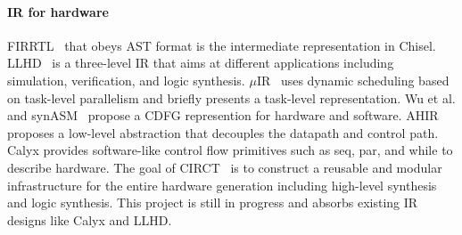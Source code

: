 


\paragraph{IR for hardware} FIRRTL~\cite{firrtl} that obeys AST format is the intermediate representation in Chisel. LLHD~\cite{LLHD_Schuiki} is a three-level IR that aims at different applications including simulation, verification, and logic synthesis. $\mu$IR~\cite{uIR_Sharifian} uses dynamic scheduling based on task-level parallelism and briefly presents a task-level representation. Wu et al. and synASM~\cite{hierarchy_cdfg, synASM} propose a CDFG represention for hardware and software. AHIR~\cite{ahir} proposes a low-level abstraction that decouples the datapath and control path. Calyx\cite{Calyx_Rachit} provides software-like control flow primitives such as seq, par, and while to describe hardware. The goal of CIRCT~\cite{circt} is to construct a reusable and modular infrastructure for the entire hardware generation including high-level synthesis and logic synthesis. This project is still in progress and absorbs existing IR designs like Calyx and LLHD.